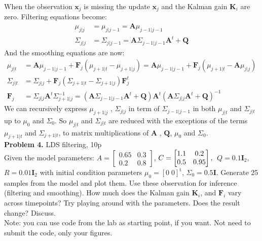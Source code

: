 \documentclass[12pt]{article}
\newcommand{\matr}[1]{\bm{#1}}     %
\newcommand{\vect}[1]{\mathbf{#1}}
\begin{document}
When the observation $\vect{x}_j$ is missing the update  $\vect{x}_j$ and the Kalman gain $\matr{K}_i$ are zero. Filtering equations become:
\begin{align*}
			\mu_{j|j}		&= \mu_{j | j-1 }		= \matr{A}  \mu_{j-1| j-1} \\
			\Sigma_{j|j}	&= \Sigma_{j|j-1}	=  \matr{A}  \Sigma_{j-1|j-1}  \matr{A}^t  +  \matr{Q} 
 \end{align*}
And the smoothing equations are now:
\begin{align*}
			\mu_{j|t}		&=	\matr{A}  \mu_{j-1| j-1} + \matr{F}_j (\mu_{j+1|t}  - \mu_{j+1|j}) = \matr{A} \mu_{j-1|j-1}  + \matr{F}_j (\mu_{j+1|t} - \matr{A} \mu_{j|j}) \\
			\Sigma_{j|t}	&=	 \Sigma_{j|j}	+ \matr{F}_j (\Sigma_{j+1|t}  - \Sigma_{j+1|j})   \matr{F}_j^t \\
			 \matr{F}_j		&= 	\Sigma_{j|j}	 \matr{A}^t  \Sigma_{j+1|j}^{-1}	= (\matr{A}  \Sigma_{j-1|j-1}  \matr{A}^t  +  \matr{Q} )	 \matr{A}^t   
			 				(\matr{A}  \Sigma_{j|j}  \matr{A}^t  +  \matr{Q} )^{-1}	
 \end{align*}
We can recursively express $\mu_{j+1|j}$ , $\Sigma_{j|j}$ in term of $\Sigma_{j-1|j-1}$ in both $\mu_{j|t}$ and $\Sigma_{j|t}$  up to $\mu_0$ and $\Sigma_0$. 
So $\mu_{j|t}$ and  $\Sigma_{j|t}$ are reduced with the exceptions of the terms $\mu_{j+1|t}$ and $\Sigma_{j+1|t}$,  
to matrix multiplications of $\matr{A}$ , $ \matr{Q}$, $\mu_0$ and $\Sigma_0$. 
\\

\noindent \textbf{Problem 4.}  LDS filtering, 10p\\ 
Given the model parameters: $A = 
\begin{bmatrix} %
0.65 &   0.3\\
    0.2   & 0.8
\end{bmatrix}
$,
$C= 
\begin{bmatrix}  
    1.1 & 0.2\\
    0.5 & 0.95\\
\end{bmatrix},\\
$
$Q= 0.1 \vect{I}_2$, 
$R= 0.01 \vect{I}_2$ with initial condition parameters $\mu_0 = [0\; 0]^\mathrm{t}$, $\Sigma_0 = 0.5 \vect{I}$.
Generate 25 samples from the model and  plot them. Use these observation for inference (filtering and smoothing). How much does the Kalman gain $\mathbf{K}_i$, and $\mathbf{F}_i$ vary across timepoints? Try playing around with the parameters. Does the result change? Discuss.\\
Note: you can use code from the lab as starting point, if you want. Not need to submit the code, only your figures.
\\
\end{document}
